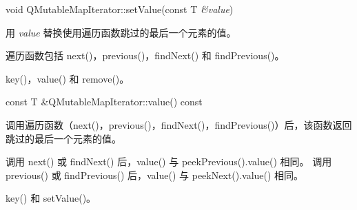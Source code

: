 void QMutableMapIterator::setValue(const T \emph{\&value})

用 \emph{value} 替换使用遍历函数跳过的最后一个元素的值。

遍历函数包括 next()，previous()，findNext() 和 findPrevious()。

\begin{seeAlso}
key()，value() 和 remove()。
\end{seeAlso}

const T \&QMutableMapIterator::value() const

调用遍历函数（next()，previous()，findNext()，findPrevious()）后，该函数返回跳过的最后一个元素的值。

调用 next() 或 findNext() 后，value() 与 peekPrevious().value() 相同。
调用 previous() 或 findPrevious() 后，value() 与 peekNext().value() 相同。

\begin{seeAlso}
key() 和 setValue()。
\end{seeAlso}
